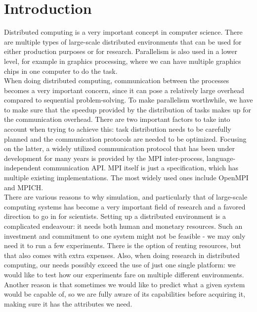 
\chapter{Introduction}
\label{Chapter1}

Distributed computing is a very important concept in computer
science. There are multiple types of large-scale distributed
environments that can be used for either production purposes or for
research. Parallelism is also used in a lower level, for example in
graphics processing, where we can have multiple graphics chips in one
computer to do the task.\\[0.3cm]
When doing distributed computing, communication between the processes
becomes a very important concern, since it can pose a relatively large
overhead compared to sequential problem-solving. To make parallelism
worthwhile, we have to make sure that the speedup provided by the
distribution of tasks makes up for the communication overhead. There
are two important factors to take into account when trying to
achieve this: task distribution needs to be carefully planned and the
communication protocols are needed to be optimized. Focusing on the
latter, a widely utilized communication protocol that has been under
development for many years
is provided by the MPI\cite{mpif12} inter-process, language-independent
communication API. MPI itself is just a specification, which has
multiple existing implementations. The most widely used ones include
OpenMPI\cite{ompi04} and MPICH\cite{glds96}\cite{gl96}.\\[0.3cm]
There are various reasons to why simulation, and particularly that of
large-scale computing systems has become a very
important field of research and a favored direction to go in for
scientists. Setting up a distributed environment is a complicated
endeavour: it needs both human and monetary resources. Such an
investment and commitment to one system might not be feasible - we may
only need it to run a few experiments. There is the option of renting
resources, but that also comes with extra expenses. Also, when doing
research in distributed computing, our needs possibly exceed the use
of just one single platform: we would like to test how our experiments
fare on multiple different environments. Another reason is that
sometimes we would like to predict what a given system would be
capable of, so we are fully aware of its capabilities before acquiring
it, making sure it has the attributes we need.\\[0.3cm]

